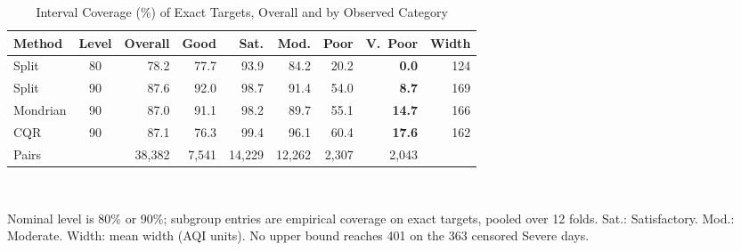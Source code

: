 \begin{table}[!t]
\caption{Interval Coverage (\%) of Exact Targets, Overall and by Observed Category}
\label{tab:intervals}
\centering
\footnotesize
\setlength{\aboverulesep}{0pt}\setlength{\belowrulesep}{0pt}\renewcommand{\arraystretch}{1.14}\setlength{\tabcolsep}{2.5pt}
\begin{tabularx}{\columnwidth}{X c r r r r r r r}
\toprule
\rowcolor{TableHeader}\textbf{Method} & \textbf{Level} & \textbf{Overall} & \textbf{Good} & \textbf{Sat.} & \textbf{Mod.} & \textbf{Poor} & \textbf{V.~Poor} & \textbf{Width}\\
\midrule
Split & 80 & 78.2 & 77.7 & 93.9 & 84.2 & 20.2 & \textbf{0.0} & 124\\
Split & 90 & 87.6 & 92.0 & 98.7 & 91.4 & 54.0 & \textbf{8.7} & 169\\
Mondrian & 90 & 87.0 & 91.1 & 98.2 & 89.7 & 55.1 & \textbf{14.7} & 166\\
CQR & 90 & 87.1 & 76.3 & 99.4 & 96.1 & 60.4 & \textbf{17.6} & 162\\
\midrule
\rowcolor{TableGroup}Pairs & & 38{,}382 & 7{,}541 & 14{,}229 & 12{,}262 & 2{,}307 & 2{,}043 & \\
\bottomrule
\end{tabularx}
\\[3pt]
\parbox{\columnwidth}{\footnotesize Nominal level is 80\% or 90\%; subgroup entries are empirical coverage on exact targets, pooled over 12 folds. Sat.: Satisfactory. Mod.: Moderate. Width: mean width (AQI units). No upper bound reaches 401 on the 363 censored Severe days.}
\end{table}
